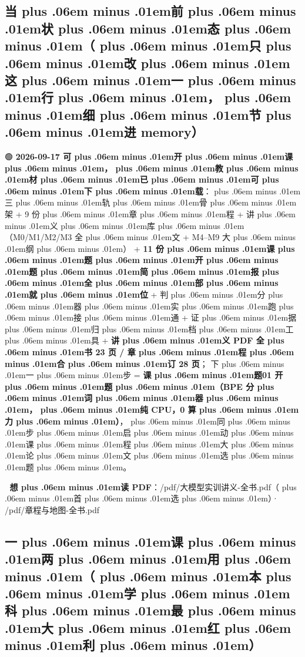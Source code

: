 \documentclass[
]{article}
\newcommand{\passthrough}[1]{#1}
\def\zh#1{{\zhfont #1}}
\def\sym#1{{\symfont #1}}
\def\emo#1{{\emofont #1}}
\def\codezh#1{{\zhmonofont #1}}
\def\zhglue{\hskip0pt plus .06em minus .01em}
\begin{document}
\subsection{\zh{当\zhglue 前\zhglue 状\zhglue 态\zhglue （\zhglue 只\zhglue 改\zhglue 这\zhglue 一\zhglue 行\zhglue ，\zhglue 细\zhglue 节\zhglue 进} memory\zh{）}}\label{ux5f53ux524dux72b6ux6001ux53eaux6539ux8fd9ux4e00ux884cux7ec6ux8282ux8fdb-memory}

\emo{🟢} \textbf{2026-09-17 \zh{可\zhglue 开\zhglue 课\zhglue ，\zhglue 教\zhglue 材\zhglue 已\zhglue 可\zhglue 下\zhglue 载}}\zh{：\zhglue 三\zhglue 轨\zhglue 骨\zhglue 架} + 9 \zh{份\zhglue 章\zhglue 程} + \zh{讲\zhglue 义\zhglue 库\zhglue （}M0/M1/M2/M3 \zh{全\zhglue 文} + M4--M9 \zh{大\zhglue 纲\zhglue ）} + \textbf{11 \zh{份\zhglue 课\zhglue 题\zhglue 开\zhglue 题\zhglue 简\zhglue 报\zhglue 全\zhglue 部\zhglue 就\zhglue 位}} + \zh{判\zhglue 分\zhglue 器\zhglue 实\zhglue 跑\zhglue 接\zhglue 通} + \zh{证\zhglue 据\zhglue 归\zhglue 档\zhglue 工\zhglue 具} + \textbf{\zh{讲\zhglue 义} PDF \zh{全\zhglue 书} 23 \zh{页} / \zh{章\zhglue 程\zhglue 合\zhglue 订} 28 \zh{页}}\zh{；} \zh{下\zhglue 一\zhglue 步} = \textbf{\zh{课\zhglue 题}01 \zh{开\zhglue 题\zhglue （}BPE \zh{分\zhglue 词\zhglue 器\zhglue ，\zhglue 纯} CPU\zh{，}0 \zh{算\zhglue 力\zhglue ）}}\zh{，\zhglue 同\zhglue 步\zhglue 启\zhglue 动\zhglue 课\zhglue 程\zhglue 大\zhglue 论\zhglue 文\zhglue 选\zhglue 题\zhglue 。}

\emo{📕} \textbf{\zh{想\zhglue 读} PDF}\zh{：}\passthrough{\codezh{{\zh{讲}}{\zh{义}}/pdf/{\zh{大}}{\zh{模}}{\zh{型}}{\zh{实}}{\zh{训}}{\zh{讲}}{\zh{义}}-{\zh{全}}{\zh{书}}.pdf}}\zh{（\zhglue 首\zhglue 选\zhglue ）}\sym{·} \passthrough{\codezh{{\zh{章}}{\zh{程}}{\zh{与}}{\zh{地}}{\zh{图}}/pdf/{\zh{章}}{\zh{程}}{\zh{与}}{\zh{地}}{\zh{图}}-{\zh{全}}{\zh{书}}.pdf}}

\subsection{\zh{一\zhglue 课\zhglue 两\zhglue 用\zhglue （\zhglue 本\zhglue 学\zhglue 科\zhglue 最\zhglue 大\zhglue 红\zhglue 利\zhglue ）}}\label{ux4e00ux8bfeux4e24ux7528ux672cux5b66ux79d1ux6700ux5927ux7ea2ux5229}
\end{document}
